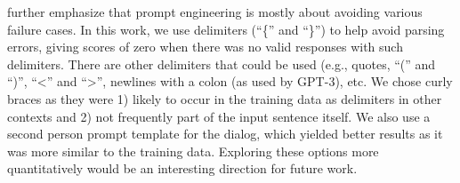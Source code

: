 

\citet{reynolds2021prompt} further emphasize that prompt engineering is mostly about avoiding various failure cases.
 In this work, we use delimiters (``\{'' and ``\}'') to help avoid parsing errors, giving scores of zero when there was no valid responses with such delimiters. There are other delimiters that could be used (e.g., quotes, ``('' and ``)'', ``<'' and ``>'', newlines with a colon (as used by GPT-3), etc. We chose curly braces as they were 1) likely to occur in the training data as delimiters in other contexts and 2) not frequently part of the input sentence itself. We also use a second person prompt template for the dialog, which yielded better results as it was more similar to the training data. Exploring these options more quantitatively would be an interesting direction for future work.

